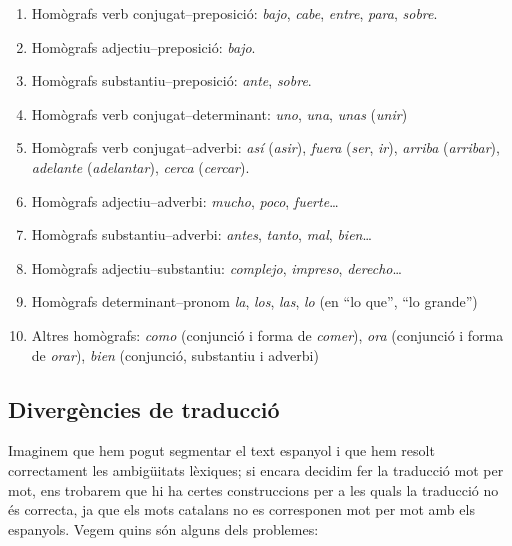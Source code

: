 \begin{enumerate}
\item Homògrafs verb conjugat--preposició: \emph{bajo}, {\em
    cabe}, \emph{entre}, \emph{para}, \emph{sobre}.

\item Homògrafs adjectiu--preposició: \emph{bajo}.

\item Homògrafs substantiu--preposició: \emph{ante}, \emph{sobre}.

\item Homògrafs verb conjugat--determinant:  \emph{uno}, \emph{una},
  \emph{unas} (\emph{unir})
    
\item Homògrafs verb conjugat--adverbi: \emph{así} (\emph{asir}),
    \emph{fuera} (\emph{ser}, \emph{ir}), \emph{ arriba} (\emph{arribar}), {\em
      adelante} (\emph{adelantar}), \emph{cerca} (\emph{cercar}).

\item Homògrafs adjectiu--adverbi: \emph{mucho}, \emph{poco}, {\em
    fuerte}\ldots

\item Homògrafs substantiu--adverbi: \emph{antes}, \emph{tanto},
  \emph{mal}, \emph{bien}\ldots

\item Homògrafs adjectiu--substantiu: \emph{complejo}, {\em
    impreso}, \emph{derecho}\ldots

\item Homògrafs determinant--pronom
    \emph{la}, \emph{los}, \emph{las}, \emph{lo} (en ``lo que'', ``lo grande'')

\item Altres homògrafs: \emph{como} (conjunció i forma de \emph{comer}), \emph{ora} 
  (conjunció i forma de \emph{orar}), \emph{bien} (conjunció, substantiu i
adverbi)

\end{enumerate}


\subsection{Divergències de traducció}

Imaginem que hem pogut segmentar el text espanyol i que hem resolt 
correctament les ambigüitats
lèxiques; si encara decidim fer la traducció mot per mot, ens
trobarem que hi ha certes construccions per a les quals la
traducció no és correcta, ja que els mots catalans no es
corresponen mot per mot amb els espanyols. Vegem quins són 
alguns dels problemes:

